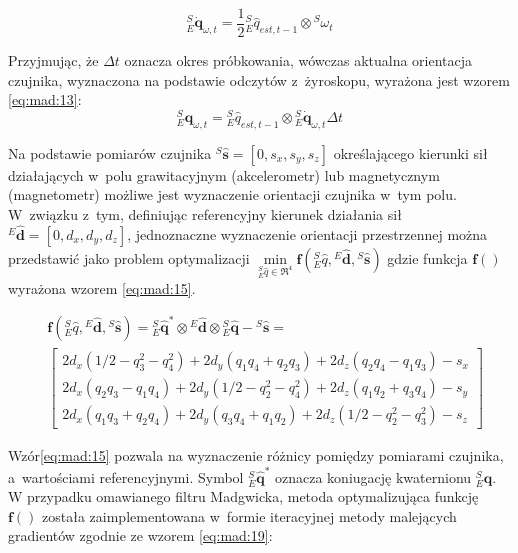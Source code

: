 \begin{equation}
	^S_E\dot{\mathbf{q}}_{\omega,t} = \frac{1}{2}{^S_E \hat{q}_{est, t-1}}\otimes {^S{\omega_t}}
	\label{eq:mad:12}
\end{equation}

Przyjmując, że $\Delta t$ oznacza okres próbkowania, wówczas aktualna orientacja czujnika, wyznaczona na podstawie odczytów z~żyroskopu, wyrażona jest wzorem \ref{eq:mad:13}:
\begin{equation}
	^S_E{\mathbf{q}}_{\omega,t} = {^S_E \hat{q}_{est, t-1}}\otimes {^S_E\dot{\mathbf{q}}_{\omega,t}}\Delta t
	\label{eq:mad:13}
\end{equation}	

Na podstawie pomiarów czujnika ${^S\hat{\mathbf{s}}} = [0,s_x,s_y,s_z]$ określającego kierunki sił działających w~polu grawitacyjnym (akcelerometr) lub magnetycznym (magnetometr)  możliwe jest wyznaczenie orientacji czujnika w~tym polu. W~związku z~tym, definiując referencyjny kierunek działania sił ${^E\hat{\mathbf{d}}} = [0,d_x,d_y,d_z]$, jednoznaczne wyznaczenie orientacji przestrzennej można przedstawić jako problem optymalizacji $\underset{{^S_E \hat{q}} \in \Re^4}{\min} \mathbf{f}({^S_E \hat{q}},{^E\hat{\mathbf{d}}} , {^S\hat{\mathbf{s}}})$ gdzie funkcja $\mathbf{f}()$ wyrażona wzorem \ref{eq:mad:15}.

\begin{equation}
	\begin{split}
		&\mathbf{f}({^S_E \hat{q}},{^E\hat{\mathbf{d}}} , {^S\hat{\mathbf{s}}}) = {^S_E \hat{\mathbf{q}}}^* \otimes {^E\hat{\mathbf{d}}} \otimes {^S_E \hat{\mathbf{q}}} - {^S\hat{\mathbf{s}}} = \\
		&\begin{bmatrix}
		2d_x(1/2 - q_3^2 - q_4^2) + 2d_y(q_1 q_4 + q_2 q_3)+2d_z(q_2 q_4 - q_1 q_3) - s_x \\
		2d_x(q_2 q_3 - q_1 q_4) + 2d_y(1/2 - q_2^2 - q_4^2)+2d_z(q_1 q_2 + q_3 q_4) - s_y \\
		2d_x(q_1 q_3 + q_2 q_4) + 2d_y(q_3 q_4 + q_1 q_2)+2d_z(1/2 - q_2^2 - q_3^2) - s_z 
		\end{bmatrix}
	\end{split}
	\label{eq:mad:15}
\end{equation}

Wzór\ref{eq:mad:15} pozwala na wyznaczenie różnicy pomiędzy pomiarami czujnika, a~wartościami referencyjnymi. Symbol ${^S_E \hat{\mathbf{q}}}^*$ oznacza koniugację kwaternionu ${^S_E \hat{\mathbf{q}}}$.
W przypadku omawianego filtru Madgwicka, metoda optymalizująca funkcję $\mathbf{f}()$ została zaimplementowana w~formie iteracyjnej metody malejących gradientów zgodnie ze wzorem \ref{eq:mad:19}:

